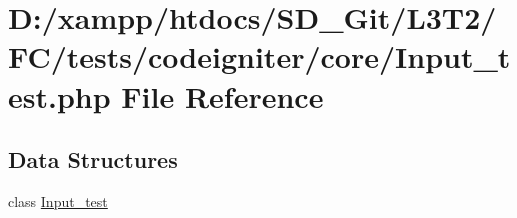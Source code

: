 \hypertarget{tests_2codeigniter_2core_2_input__test_8php}{}\section{D\+:/xampp/htdocs/\+S\+D\+\_\+\+Git/\+L3\+T2/\+F\+C/tests/codeigniter/core/\+Input\+\_\+test.php File Reference}
\label{tests_2codeigniter_2core_2_input__test_8php}
\subsection*{Data Structures}
\begin{DoxyCompactItemize}
\item 
class \hyperlink{class_input__test}{Input\+\_\+test}
\end{DoxyCompactItemize}
